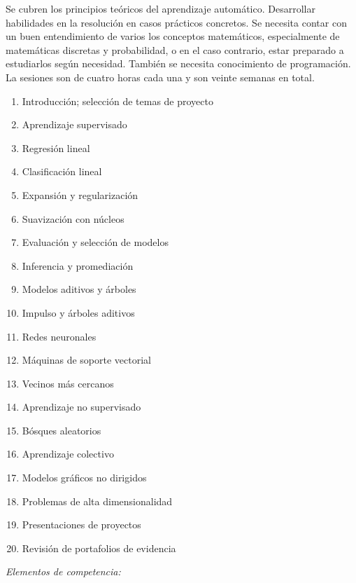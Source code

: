 \documentclass[10 pt]{article}
\begin{document}
Se cubren los principios te\'{o}ricos del aprendizaje
autom\'{a}tico. Desarrollar habilidades en la resoluci\'{o}n en casos
pr\'{a}cticos concretos. Se necesita contar con un buen entendimiento de varios los conceptos
matem\'{a}ticos, especialmente de matem\'{a}ticas discretas y probabilidad, o
en el caso contrario, estar preparado a estudiarlos seg\'{u}n
necesidad. Tambi\'{e}n se necesita conocimiento de programaci\'{o}n.
La sesiones son de cuatro horas cada una y son veinte semanas en total.
\begin{enumerate}[itemsep=-3pt]
\item{Introducci\'{o}n; selecci\'{o}n de temas de proyecto}
\item{Aprendizaje supervisado}
\item{Regresi\'{o}n lineal}
\item{Clasificaci\'{o}n lineal}
\item{Expansi\'{o}n y regularizaci\'{o}n}
\item{Suavizaci\'{o}n con n\'{u}cleos}
\item{Evaluaci\'{o}n y selecci\'{o}n de modelos}
\item{Inferencia y promediaci\'{o}n}
\item{Modelos aditivos y \'{a}rboles}
\item{Impulso y \'{a}rboles aditivos}
\item{Redes neuronales}
\item{M\'{a}quinas de soporte vectorial}
\item{Vecinos m\'{a}s cercanos}
\item{Aprendizaje no supervisado}
\item{B\'{o}sques aleatorios}
\item{Aprendizaje colectivo}
\item{Modelos gr\'{a}ficos no dirigidos}
\item{Problemas de alta dimensionalidad}
\item{Presentaciones de proyectos}
\item{Revisi\'{o}n de portafolios de evidencia}
\end{enumerate}

{\em Elementos de competencia:}
\end{document}
